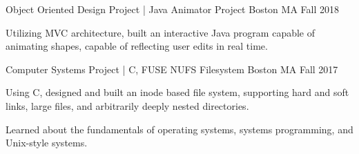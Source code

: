 

\begin{cventries}
  \cventry
    {Object Oriented Design Project | Java} %
    {Animator Project} %
    {Boston MA} %
    {Fall 2018} %
    {
      \begin{cvitems} %
        \item {Utilizing MVC architecture, built an interactive Java program capable of animating shapes, capable of reflecting user edits in real time.}
      \end{cvitems}
    }

  \cventry
    {Computer Systems Project | C, FUSE} %
    {NUFS Filesystem} %
    {Boston MA} %
    {Fall 2017} %
    {
      \begin{cvitems} %
        \item {Using C, designed and built an inode based file system, supporting hard and soft links, large files, and arbitrarily deeply nested directories.}
        \item {Learned about the fundamentals of operating systems, systems programming, and Unix-style systems.}
      \end{cvitems}
    }


\end{cventries}
